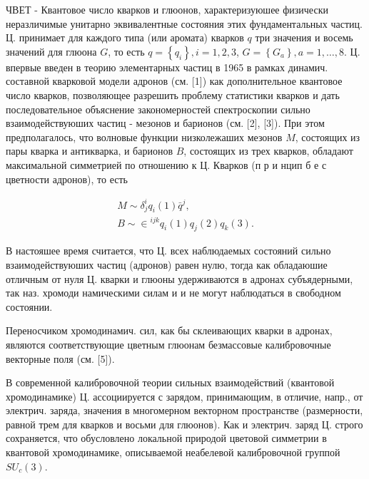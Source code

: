 \documentclass[10pt]{article}
\begin{document}
ЧВЕТ - Квантовое число кварков и глюонов, характеризуюшее физически неразличимые унитарно эквивалентные состояния этих фундаментальных частиц. Ц. принимает для каждого типа (или аромата) кварков $q$ три значения и восемь значений для глюона $G$, то есть $q=\left\{q_{i}\right\}, i=1,2,3$, $G=\left\{G_{a}\right\}, a=1, \ldots, 8$. Ц. впервые введен в теорию элементарных частиц в 1965 в рамках динамич. составной кварковой модели адронов (см. [1]) как дополнительное квантовое число кварков, позволяющее разрешить проблему статистики кварков и дать последовательное объяснение закономерностей спектроскопии сильно взаимодействуюших частиц - мезонов и барионов (см. [2], [3]). При этом предполагалось, что волновые функции низколежаших мезонов $M$, состоящих из пары кварка и антикварка, и барионов $B$, состоящих из трех кварков, обладают максимальной симметрией по отношению к Ц. Кварков (п р и нцип б е с цветности адронов), то есть



\[

\begin{gathered}

M \sim \delta_{j}^{i} q_{i}(1) \bar{q}^{j}, \\

B \sim \in{ }^{i j k} q_{i}(1) q_{j}(2) q_{k}(3) .

\end{gathered}

\]



В настояшее время считается, что Ц. всех наблюдаемых состояний сильно взаимодействуюших частиц (адронов) равен нулю, тогда как обладаюшие отличным от нуля Ц. кварки и глюоны удерживаются в адронах субъядерными, так наз. хромоди намическими силам и и не могут наблюдаться в свободном состоянии.



Переносчиком хромодинамич. сил, как бы склеивающих кварки в адронах, являются соответствующие цветным глюонам безмассовые калибровочные векторные поля (см. [5]).



В современной калибровочной теории сильных взаимодействий (квантовой хромодинамике) Ц. ассоциируется с зарядом, принимающим, в отличие, напр., от электрич. заряда, значения в многомерном векторном пространстве (размерности, равной трем для кварков и восьми для глюонов). Как и электрич. заряд Ц. строго сохраняется, что обусловлено локальной природой цветовой симметрии в квантовой хромодинамике, описываемой неабелевой калибровочной группой $S U_{c}(3)$.
\end{document}
